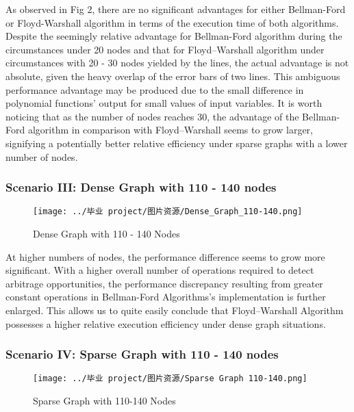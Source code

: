 \documentclass[12pt]{article}
\begin{document}
As observed in Fig 2, there are no significant advantages for either Bellman-Ford or Floyd-Warshall algorithm in terms of the execution time of both algorithms. Despite the seemingly relative advantage for Bellman-Ford algorithm during the circumstances under 20 nodes and that for Floyd–Warshall algorithm under circumstances with 20 - 30 nodes yielded by the lines, the actual advantage is not absolute, given the heavy overlap of the error bars of two lines. This ambiguous performance advantage may be produced due to the small difference in polynomial functions' output for small values of input variables. It is worth noticing that as the number of nodes reaches 30, the advantage of the Bellman-Ford algorithm in comparison with Floyd–Warshall seems to grow larger, signifying a potentially better relative efficiency under sparse graphs with a lower number of nodes.

\subsubsection{Scenario III: Dense Graph with 110 - 140 nodes}

\begin{figure}[H]
    \renewcommand{\figurename}{Fig} %
    \centering
    \texttt{[image: ../毕业 project/图片资源/Dense\_Graph\_110-140.png]}

    \caption{Dense Graph with 110 - 140 Nodes}
    \end{figure}

At higher numbers of nodes, the performance difference seems to grow more significant. With a higher overall number of operations required to detect arbitrage opportunities, the performance discrepancy resulting from greater constant operations in Bellman-Ford Algorithms's implementation is further enlarged. This allows us to quite easily conclude that Floyd–Warshall Algorithm possesses a higher relative execution efficiency under dense graph situations. 

\subsubsection{Scenario IV: Sparse Graph with 110 - 140 nodes}

\begin{figure}[H]
    \renewcommand{\figurename}{Fig} %
    \centering
    \texttt{[image: ../毕业 project/图片资源/Sparse Graph 110-140.png]}

    \caption{Sparse Graph with 110-140 Nodes}
    \end{figure}
\end{document}
